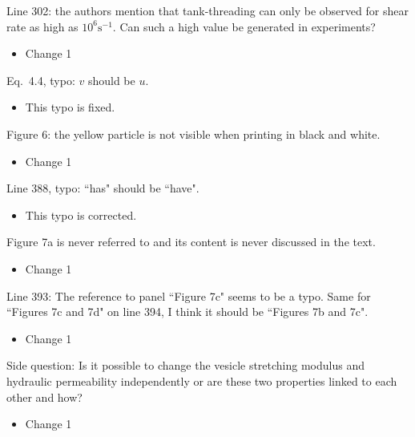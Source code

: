\documentclass[11pt]{article}
\newcommand{\comment}[1]{{\color{blue} #1}}
\begin{document}
\noindent
\comment{Line 302: the authors mention that tank-threading can only be
observed for shear rate as high as $10^{6}\text{s}^{-1}$. Can such a
high value be generated in experiments?}
\begin{itemize}
  \item Change 1 
\end{itemize}

\noindent
\comment{Eq.~4.4, typo: $v$ should be $u$.}
\begin{itemize}
  \item This typo is fixed.
\end{itemize}

\noindent
\comment{Figure 6: the yellow particle is not visible when printing in
black and white.}
\begin{itemize}
  \item Change 1 
\end{itemize}

\noindent
\comment{Line 388, typo: ``has" should be ``have".}
\begin{itemize}
  \item This typo is corrected.
\end{itemize}

\noindent
\comment{Figure 7a is never referred to and its content is never
discussed in the text.}
\begin{itemize}
  \item Change 1 
\end{itemize}

\noindent
\comment{Line 393: The reference to panel ``Figure 7c" seems to be a
typo. Same for ``Figures 7c and 7d" on line 394, I think it should be
``Figures 7b and 7c".}
\begin{itemize}
  \item Change 1 
\end{itemize}

\noindent
\comment{Side question: Is it possible to change the vesicle stretching
modulus and hydraulic permeability independently or are these two
properties linked to each other and how?}
\begin{itemize}
  \item Change 1 
\end{itemize}
\end{document}
